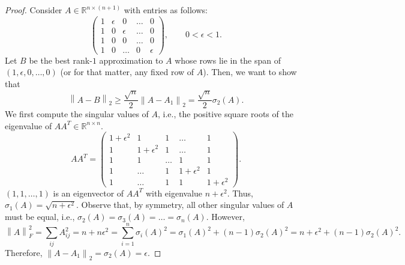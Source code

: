 \documentclass[11pt]{article}
\def\reals{\mathbb{R}}
\def\eps{\epsilon}
\newcommand{\norm}[1]{\left\|#1\right\|}
\newcommand{\frob}[1]{\left\|#1\right\|_{F}}
\begin{document}
\begin{proof}
Consider $A \in \reals^{n \times (n+1)}$ with entries as follows:
\[
\left(\begin{array}{ccccc}
1 & \eps & 0 & \dotsc & 0 \\
1 & 0 & \eps & \dotsc & 0 \\
1 & 0 & 0 & \dotsc & 0 \\
1 & 0 & \dotsc & 0 & \eps
\end{array}\right), \qquad 0 < \eps < 1.
\]
Let $B$ be the best rank-$1$ approximation to $A$ whose rows lie in the span of $(1, \eps, 0, \dotsc, 0)$ (or for that matter, any fixed row of $A$). Then, we want to show that
\[
\norm{A - B}_{2} \geq \frac{\sqrt{n}}{2} \norm{A - A_{1}}_{2} = \frac{\sqrt{n}}{2} \sigma_{2}(A).
\]
We first compute the singular values of $A$, i.e., the positive square roots of the eigenvalue of $AA^{T} \in \reals^{n \times n}$.
\[
AA^{T} = \left(\begin{array}{ccccc}
1+\eps^{2} & 1 & 1 & \dotsc & 1 \\
1 & 1+\eps^{2} & 1 & \dotsc & 1 \\
1 & 1 & \dotsc & 1 & 1 \\
1 & \dotsc & 1 & 1+\eps^{2} & 1 \\
1 & \dotsc & 1 & 1 & 1+\eps^{2}
\end{array}\right).
\]
$(1, 1, \dotsc, 1)$ is an eigenvector of $AA^{T}$ with eigenvalue $n+\eps^{2}$. Thus, $\sigma_{1}(A) = \sqrt{n+\eps^{2}}$. Observe that, by symmetry, all other singular values of $A$ must be equal, i.e., $\sigma_{2}(A) = \sigma_{3}(A) = \dotsc = \sigma_{n}(A)$. However,
\[
\frob{A}^{2} = \sum_{ij} A_{ij}^{2} = n+n\eps^{2} = \sum_{i=1}^{n} \sigma_{i}(A)^{2} = \sigma_{1}(A)^{2} + (n-1)\sigma_{2}(A)^{2} = n+\eps^{2} + (n-1)\sigma_{2}(A)^{2}.
\]
Therefore, $\norm{A-A_{1}}_{2} = \sigma_{2}(A) = \eps$.


\end{proof}
\end{document}
